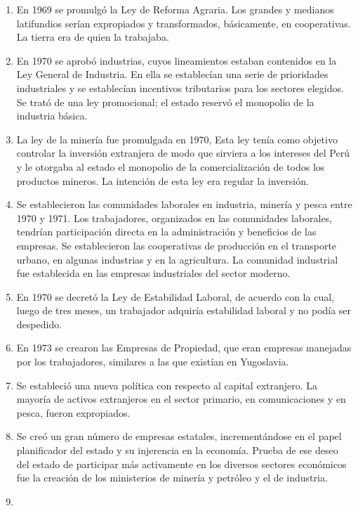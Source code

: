 \documentclass[
  jou,
  floatsintext,
  longtable,
  a4paper,
  nolmodern,
  notxfonts,
  notimes,
  colorlinks=true,linkcolor=blue,citecolor=blue,urlcolor=blue]{apa7}
\providecommand{\tightlist}{%
  \setlength{\itemsep}{0pt}\setlength{\parskip}{0pt}}
\begin{document}
\begin{enumerate}
\def\labelenumi{\arabic{enumi}.}
\tightlist
\item
  En 1969 se promulgó la Ley de Reforma Agraria. Los grandes y medianos
  latifundios serían expropiados y transformados, básicamente, en
  cooperativas. La tierra era de quien la trabajaba.
\item
  En 1970 se aprobó industrias, cuyos lineamientos estaban contenidos en
  la Ley General de Industria. En ella se establecían una serie de
  prioridades industriales y se establecían incentivos tributarios para
  los sectores elegidos. Se trató de una ley promocional; el estado
  reservó el monopolio de la industria básica.
\item
  La ley de la minería fue promulgada en 1970, Esta ley tenía como
  objetivo controlar la inversión extranjera de modo que sirviera a los
  intereses del Perú y le otorgaba al estado el monopolio de la
  comercialización de todos los productos mineros. La intención de esta
  ley era regular la inversión.
\item
  Se establecieron las comunidades laborales en industria, minería y
  pesca entre 1970 y 1971. Los trabajadores, organizados en las
  comunidades laborales, tendrían participación directa en la
  administración y beneficios de las empresas. Se establecieron las
  cooperativas de producción en el transporte urbano, en algunas
  industrias y en la agricultura. La comunidad industrial fue
  establecida en las empresas industriales del sector moderno.
\item
  En 1970 se decretó la Ley de Estabilidad Laboral, de acuerdo con la
  cual, luego de tres meses, un trabajador adquiría estabilidad laboral
  y no podía ser despedido.
\item
  En 1973 se crearon las Empresas de Propiedad, que eran empresas
  manejadas por los trabajadores, similares a las que existían en
  Yugoslavia.
\item
  Se estableció una nueva política con respecto al capital extranjero.
  La mayoría de activos extranjeros en el sector primario, en
  comunicaciones y en pesca, fueron expropiados.
\item
  Se creó un gran número de empresas estatales, incrementándose en el
  papel planificador del estado y su injerencia en la economía. Prueba
  de ese deseo del estado de participar más activamente en los diversos
  sectores económicos fue la creación de los ministerios de minería y
  petróleo y el de industria.
\item

\end{enumerate}
\end{document}
